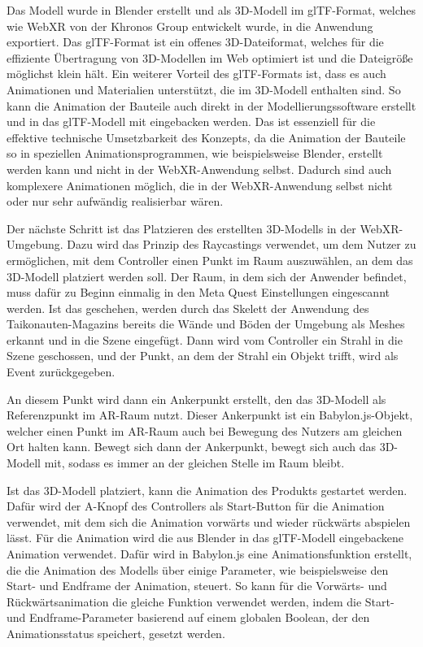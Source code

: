Das Modell wurde in Blender erstellt und als 3D-Modell im glTF-Format, welches wie WebXR von der Khronos Group entwickelt wurde, in die Anwendung exportiert.
Das glTF-Format ist ein offenes 3D-Dateiformat, welches für die effiziente Übertragung von 3D-Modellen im Web optimiert ist und die Dateigröße möglichst klein hält.
Ein weiterer Vorteil des glTF-Formats ist, dass es auch Animationen und Materialien unterstützt, die im 3D-Modell enthalten sind.
So kann die Animation der Bauteile auch direkt in der Modellierungssoftware erstellt und in das glTF-Modell mit eingebacken werden.
Das ist essenziell für die effektive technische Umsetzbarkeit des Konzepts, da die Animation der Bauteile so in speziellen Animationsprogrammen, wie beispielsweise Blender, erstellt werden kann und nicht in der WebXR-Anwendung selbst.
Dadurch sind auch komplexere Animationen möglich, die in der WebXR-Anwendung selbst nicht oder nur sehr aufwändig realisierbar wären.

Der nächste Schritt ist das Platzieren des erstellten 3D-Modells in der WebXR-Umgebung.
Dazu wird das Prinzip des Raycastings verwendet, um dem Nutzer zu ermöglichen, mit dem Controller einen Punkt im Raum auszuwählen, an dem das 3D-Modell platziert werden soll.
Der Raum, in dem sich der Anwender befindet, muss dafür zu Beginn einmalig in den Meta Quest Einstellungen eingescannt werden.
Ist das geschehen, werden durch das Skelett der Anwendung des Taikonauten-Magazins bereits die Wände und Böden der Umgebung als Meshes erkannt und in die Szene eingefügt.
Dann wird vom Controller ein Strahl in die Szene geschossen, und der Punkt, an dem der Strahl ein Objekt trifft, wird als Event zurückgegeben.

An diesem Punkt wird dann ein Ankerpunkt erstellt, den das 3D-Modell als Referenzpunkt im AR-Raum nutzt.
Dieser Ankerpunkt ist ein Babylon.js-Objekt, welcher einen Punkt im AR-Raum auch bei Bewegung des Nutzers am gleichen Ort halten kann.
Bewegt sich dann der Ankerpunkt, bewegt sich auch das 3D-Modell mit, sodass es immer an der gleichen Stelle im Raum bleibt.


Ist das 3D-Modell platziert, kann die Animation des Produkts gestartet werden.
Dafür wird der A-Knopf des Controllers als Start-Button für die Animation verwendet, mit dem sich die Animation vorwärts und wieder rückwärts abspielen lässt.
Für die Animation wird die aus Blender in das glTF-Modell eingebackene Animation verwendet.
Dafür wird in Babylon.js eine Animationsfunktion erstellt, die die Animation des Modells über einige Parameter, wie beispielsweise den Start- und Endframe der Animation, steuert.
So kann für die Vorwärts- und Rückwärtsanimation die gleiche Funktion verwendet werden, indem die Start- und Endframe-Parameter basierend auf einem globalen Boolean, der den Animationsstatus speichert, gesetzt werden.

